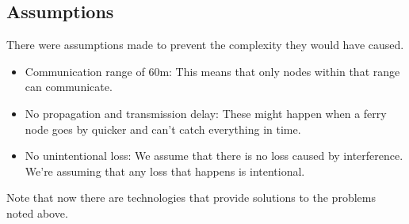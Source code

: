 \subsection{Assumptions}

There were assumptions made to prevent the complexity they would have caused.

\begin{itemize}
\item Communication range of 60m:
	This means that only nodes within that range can communicate. 

\item No propagation and transmission delay:
	These might happen when a ferry node goes by quicker and can't catch everything in time. 
	
\item No unintentional loss:
	We assume that there is no loss caused by interference. We're assuming that any loss that happens is 			intentional.
	
	
\end{itemize}

Note that now there are technologies that provide solutions to the problems noted above. 






